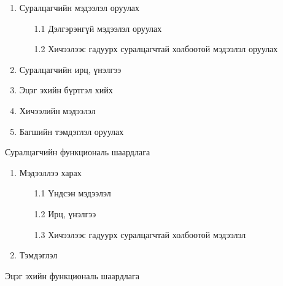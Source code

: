 \begin{enumerate}
	\item Суралцагчийн мэдээлэл оруулах
	\begin{enumerate}
		\item[1.1] Дэлгэрэнгүй мэдээлэл оруулах
		\item[1.2] Хичээлээс гадуурх суралцагчтай холбоотой мэдээлэл оруулах
	\end{enumerate}
	\item Суралцагчийн ирц, үнэлгээ
	\item Эцэг эхийн бүртгэл хийх
	\item Хичээлийн мэдээлэл
	\item Багшийн тэмдэглэл оруулах
\end{enumerate}
Суралцагчийн функциональ шаардлага
\begin{enumerate}
	\item Мэдээллээ харах
	\begin{enumerate}
		\item[1.1] Үндсэн мэдээлэл
		\item[1.2] Ирц, үнэлгээ
		\item[1.3] Хичээлээс гадуурх суралцагчтай холбоотой мэдээлэл
	\end{enumerate}
	\item Тэмдэглэл
\end{enumerate}
Эцэг эхийн функциональ шаардлага
